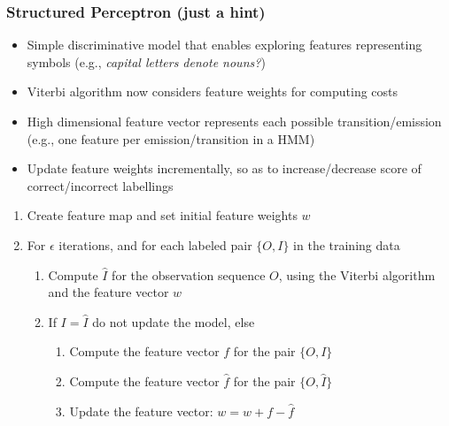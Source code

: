 \documentclass{beamer}
\begin{document}
\begin{frame} \frametitle{Structured Perceptron (just a hint)}
  
   \begin{itemize}
   \scriptsize
   \item Simple discriminative model that enables exploring features representing symbols (e.g., {\it capital letters denote nouns?})
   \item Viterbi algorithm now considers feature weights for computing costs
   \item High dimensional feature vector represents each possible transition/emission (e.g., one feature per emission/transition in a HMM)
   \item Update feature weights incrementally, so as to increase/decrease score of correct/incorrect labellings
   \end{itemize}
  
   \begin{block}{}
   \begin{enumerate}
   \item Create feature map and set initial feature weights $w$
   \item For $\epsilon$ iterations, and for each labeled pair $\{O,I\}$ in the training data
   \begin{enumerate}
   \item Compute $\hat{I}$ for the observation sequence $O$, using the Viterbi algorithm and the feature vector $w$
   \item If $I=\hat{I}$ do not update the model, else
   \begin{enumerate}
   \item Compute the feature vector $f$ for the pair $\{O,I\}$
   \item Compute the feature vector $\hat{f}$ for the pair $\{O,\hat{I}\}$
   \item Update the feature vector: $w = w + f - \hat{f}$
   \end{enumerate}
   \end{enumerate}
   \end{enumerate}
   \end{block}
 \end{frame}
 
\end{document}
